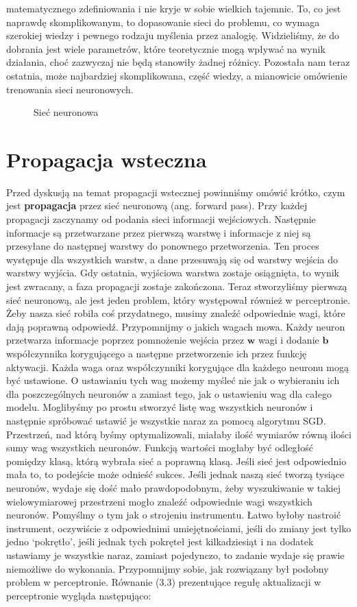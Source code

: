 matematycznego zdefiniowania i nie kryje w sobie wielkich tajemnic. To, co jest naprawdę skomplikowanym, to dopasowanie sieci do problemu, co wymaga szerokiej wiedzy i pewnego rodzaju myślenia przez analogię. Widzieliśmy, że do dobrania jest wiele parametrów, które teoretycznie mogą wpływać na wynik działania, choć zazwyczaj nie będą stanowiły żadnej różnicy. Pozostała nam teraz ostatnia, może najbardziej skomplikowana, część wiedzy, a mianowicie omówienie trenowania sieci neuronowych.

\clearpage
\begin{figure}[H]
\centering

\caption{Sieć neuronowa}
\end{figure}
\clearpage

\section{Propagacja wsteczna}

Przed dyskusją na temat propagacji wstecznej powinniśmy omówić krótko, czym jest \textbf{propagacja} przez sieć neuronową (ang. forward pass). Przy każdej propagacji zaczynamy od podania sieci informacji wejściowych. Następnie informacje są przetwarzane przez pierwszą warstwę i informacje z niej są przesyłane do następnej warstwy do ponownego przetworzenia. Ten proces występuje dla wszystkich warstw, a dane przesuwają się od warstwy wejścia do warstwy wyjścia. Gdy ostatnia, wyjściowa warstwa zostaje osiągnięta, to wynik jest zwracany, a faza propagacji zostaje zakończona. Teraz stworzyliśmy pierwszą sieć neuronową, ale jest jeden problem, który występował również w perceptronie. Żeby nasza sieć robiła coś przydatnego, musimy znaleźć odpowiednie wagi, które dają poprawną odpowiedź. Przypomnijmy o jakich wagach mowa. Każdy neuron przetwarza informacje poprzez pomnożenie wejścia przez $\boldsymbol{w}$ wagi i dodanie $\boldsymbol{b}$ współczynnika korygującego a następne przetworzenie ich przez funkcję aktywacji. Każda waga oraz współczynniki korygujące dla każdego neuronu mogą być ustawione. O ustawianiu tych wag możemy myśleć nie jak o wybieraniu ich dla poszczególnych neuronów a zamiast tego, jak o ustawieniu wag dla całego modelu. Moglibyśmy po prostu stworzyć listę wag wszystkich neuronów i następnie spróbować ustawić je wszystkie naraz za pomocą algorytmu SGD. Przestrzeń, nad którą byśmy optymalizowali, miałaby ilość wymiarów równą ilości sumy wag wszystkich neuronów. Funkcją wartości mogłaby być odległość pomiędzy klasą, którą wybrała sieć a poprawną klasą. Jeśli sieć jest odpowiednio mała to, to podejście może odnieść sukces. Jeśli jednak naszą sieć tworzą tysiące neuronów, wydaje się dość mało prawdopodobnym, żeby wyszukiwanie w takiej wielowymiarowej przestrzeni mogło znaleźć odpowiednie wagi wszystkich neuronów. Pomyślmy o tym jak o strojeniu instrumentu. Łatwo byłoby nastroić instrument, oczywiście z odpowiednimi umiejętnościami, jeśli do zmiany jest tylko jedno ‘pokrętło’, jeśli jednak tych pokręteł jest kilkadziesiąt i na dodatek ustawiamy je wszystkie naraz, zamiast pojedynczo, to zadanie wydaje się prawie niemożliwe do wykonania. Przypomnijmy sobie, jak rozwiązany był podobny problem w perceptronie. Równanie (3.3) prezentujące regułę aktualizacji w perceptronie wygląda następująco:

